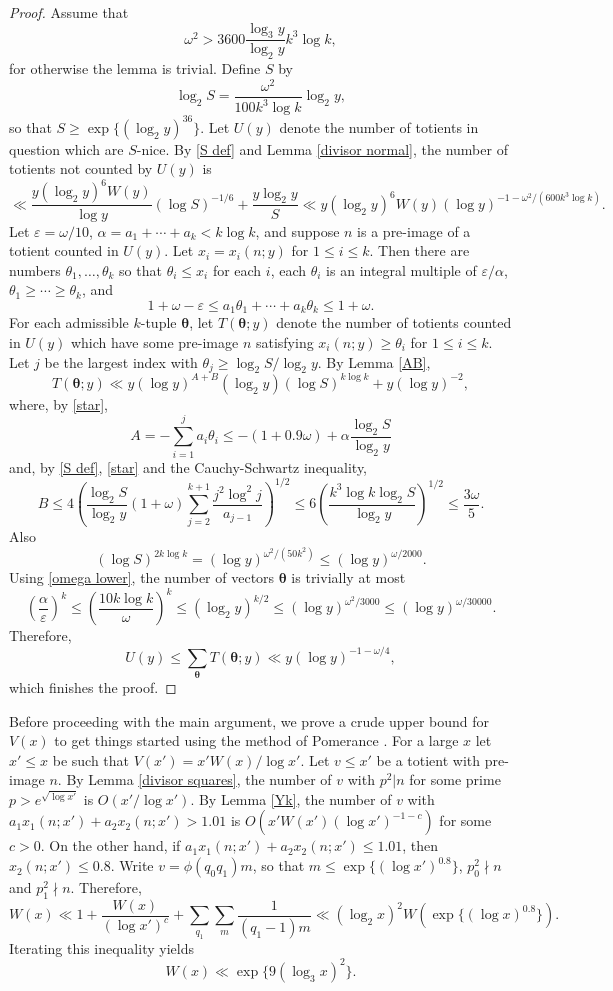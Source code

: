 \documentclass[11pt]{amsart}
\theoremstyle{remark}
\theoremstyle{plain}
\numberwithin{equation}{section}
\newcommand{\be}{\begin{equation}}
\newcommand{\ee}{\end{equation}}
\renewcommand{\a}{\ensuremath{\alpha}}
\newcommand{\e}{\ensuremath{\varepsilon}}
\renewcommand{\(}{\left(}
\renewcommand{\)}{\right)}
\newcommand{\pfrac}[2]{\left(\frac{#1}{#2}\right)}
\renewcommand{\le}{\leqslant}
\renewcommand{\ge}{\geqslant}
\newcommand{\vta}{\boldsymbol\theta}
\begin{document}
\begin{proof}  Assume that
\be\label{omega lower}
\omega^2 > 3600 \frac{\log_3 y}{\log_2 y} k^3 \log k,
\ee
for otherwise the lemma is trivial.  Define $S$ by
\be\label{S def}
\log_2 S = \frac{\omega^2}{100k^3 \log k} \log_2 y,
\ee
so that $S\ge \exp\{(\log_2 y)^{36} \}$.
Let $U(y)$ denote the number of totients in question which are $S$-nice.  
By \eqref{S def} and Lemma \ref{divisor normal}, the number of totients not counted by
$U(y)$ is
\[
\ll \frac{y(\log_2 y)^6 W(y)}{\log y} (\log S)^{-1/6} + \frac{y\log_2 y}{S}
\ll y(\log_2 y)^6 W(y) (\log y)^{-1-\omega^2/(600k^3\log k)}.
\]
Let $\e=\omega/10$, $\a=a_1+\cdots+a_k<k\log k$,
and suppose $n$ is a pre-image of a totient counted
in $U(y)$.
  Let $x_i=x_i(n;y)$ for $1\le i\le k$.  Then there are numbers
$\theta_1, \ldots, \theta_k$ so that $\theta_i\le x_i$ for each $i$,
 each $\theta_i$ is
an integral multiple of $\e/\a$, $\theta_1\ge \cdots \ge \theta_k$, and
\be\label{star}
1+\omega-\e \le a_1 \theta_1 + \cdots + a_k \theta_k \le
1+\omega.
\ee
For each admissible $k$-tuple $\vta$,
let $T(\vta;y)$ denote the number of totients counted in $U(y)$ which
have some pre-image $n$ satisfying $x_i(n;y) \ge \theta_i$ for $1\le i\le k$.
Let $j$ be the largest index with $\theta_j \ge \log_2 S/\log_2 y$.
By Lemma \ref{AB},
$$
T(\vta;y) \ll y(\log y)^{A+B}(\log_2 y)(\log S)^{k\log k} + y(\log y)^{-2},
$$
where, by \eqref{star},
$$
A = - \sum_{i=1}^j a_i \theta_i \le - (1+0.9 \omega)
 + \a \frac{\log_2 S}{\log_2 y}
$$
and, by \eqref{S def}, \eqref{star} and the Cauchy-Schwartz inequality,
\[
B \le 4\(\frac{\log_2 S}{\log_2 y}(1+\omega) \sum_{j=2}^{k+1}
\frac{j^2\log^2 j}{a_{j-1}} \)^{1/2}
\le 6\pfrac{k^3 \log k \log_2 S}{\log_2 y}^{1/2} \le \frac{3\omega}{5}.
\]
Also
$$
(\log S)^{2k\log k}=(\log y)^{\omega^2/(50k^2)} \le (\log y)^{\omega/2000}.
$$
Using \eqref{omega lower}, the number of vectors $\vta$ is trivially at most
\[
\pfrac{\a}{\e}^k \le \pfrac{10k\log k}{\omega}^k \le (\log_2 y)^{k/2} 
\le (\log y)^{\omega^2/3000}
\le(\log y)^{\omega/30000}.
\]
Therefore,
$$
U(y) \le \sum_{\vta} T(\vta;y) \ll y (\log y)^{-1-\omega/4},
$$
which finishes the proof.
\end{proof}

Before proceeding with the main argument, we prove a crude upper bound
for $V(x)$ to get things started using the method
of Pomerance \cite{P1}.  For a large $x$ let $x'\le x$ be such that $V(x')=x'W(x)/\log x'$.
Let $v\le x'$ be a totient with pre-image $n$.
By Lemma \ref{divisor squares}, the
 number of $v$ with  $p^2|n$  for some 
prime $p>e^{\sqrt{\log x'}}$  is $O(x'/\log x')$. 
 By Lemma \ref{Yk}, the number of $v$ with
$a_1 x_1(n;x')+a_2 x_2(n;x') > 1.01$ is $O(x' W(x') (\log x')^{-1-c})$ for some $c>0$.
On the other hand, if $a_1 x_1(n;x')+a_2 x_2(n;x') \le 1.01$, then
$x_2(n;x')\le 0.8$.   Write $v=\phi(q_0 q_1) m$, so that
$m\le \exp\{(\log x')^{0.8} \}$, $p_0^2\nmid n$ and $p_1^2\nmid n$. Therefore,
$$
W(x) \ll 1 + \frac{W(x)}{(\log x')^c} + 
\sum_{q_1} \sum_{m} \frac{1}{(q_1-1)m} \ll
(\log_2 x)^2  W(\exp\{(\log x)^{0.8} \}).
$$
Iterating this inequality yields 
\be\label{crude}
W(x) \ll \exp \{ 9(\log_3 x)^2 \}.
\ee
\medskip
\end{document}
